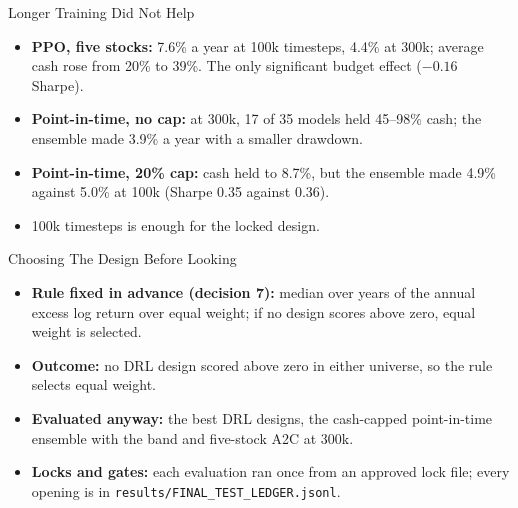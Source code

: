 \begin{frame}{Longer Training Did Not Help}
\begin{itemize}
  \item \textbf{PPO, five stocks:} 7.6\% a year at 100k timesteps, 4.4\% at 300k; average cash rose from 20\% to 39\%. The only significant budget effect ($-0.16$ Sharpe).
  \item \textbf{Point-in-time, no cap:} at 300k, 17 of 35 models held 45--98\% cash; the ensemble made 3.9\% a year with a smaller drawdown.
  \item \textbf{Point-in-time, 20\% cap:} cash held to 8.7\%, but the ensemble made 4.9\% against 5.0\% at 100k (Sharpe 0.35 against 0.36).
  \item 100k timesteps is enough for the locked design.
\end{itemize}
\end{frame}

\begin{frame}{Choosing The Design Before Looking}
\begin{itemize}
  \item \textbf{Rule fixed in advance (decision 7):} median over years of the annual excess log return over equal weight; if no design scores above zero, equal weight is selected.
  \item \textbf{Outcome:} no DRL design scored above zero in either universe, so the rule selects equal weight.
  \item \textbf{Evaluated anyway:} the best DRL designs, the cash-capped point-in-time ensemble with the band and five-stock A2C at 300k.
  \item \textbf{Locks and gates:} each evaluation ran once from an approved lock file; every opening is in \texttt{results/FINAL\_TEST\_LEDGER.jsonl}.
\end{itemize}
\end{frame}

